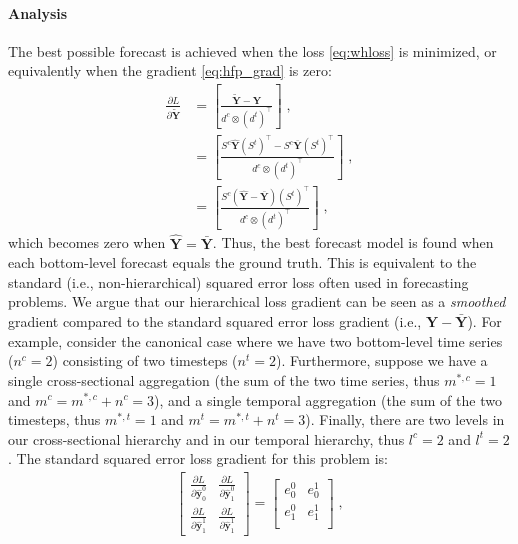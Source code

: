 \documentclass[preprint, 3p, times, twocolumn]{elsarticle}
\begin{document}
\paragraph{Analysis} The best possible forecast is achieved when the loss \eqref{eq:whloss} is minimized, or equivalently when the gradient \eqref{eq:hfp_grad} is zero:
\begin{align} 
  \frac{\partial L}{\partial \tilde{\textbf{Y}}} &=  \left[ \frac{\tilde{\textbf{Y}} - \textbf{Y}}{ d^c \otimes (d^t)^\intercal } \right] \;, \nonumber \\
                                                 &=  \left[ \frac{S^c \hat{\textbf{Y}} (S^t)^\intercal - S^c \bar{\textbf{Y}} (S^t)^\intercal}{ d^c \otimes (d^t)^\intercal } \right] \;, \nonumber \\
                                                 &=  \left[ \frac{S^c \left(\hat{\textbf{Y}} - \bar{\textbf{Y}}\right) (S^t)^\intercal}{ d^c \otimes (d^t)^\intercal } \right] \;, \nonumber
\end{align}
which becomes zero when \(\hat{\textbf{Y}} = \bar{\textbf{Y}}\). Thus, the best forecast model is found when each bottom-level forecast equals the ground truth. This is equivalent to the standard (i.e., non-hierarchical) squared error loss often used in forecasting problems. We argue that our hierarchical loss gradient can be seen as a \textit{smoothed} gradient compared to the standard squared error loss gradient (i.e., \(\hat{\textbf{Y}} - \bar{\textbf{Y}}\)). For example, consider the canonical case where we have two bottom-level time series (\(n^c=2\)) consisting of two timesteps (\(n^t=2\)). Furthermore, suppose we have a single cross-sectional aggregation (the sum of the two time series, thus \(m^{*,c} = 1\) and \(m^c = m^{*,c} + n^c = 3\)), and a single temporal aggregation (the sum of the two timesteps, thus \(m^{*,t} = 1\) and \(m^t = m^{*,t} + n^t = 3\)). Finally, there are two levels in our cross-sectional hierarchy and in our temporal hierarchy, thus \(l^c = 2\) and \(l^t = 2\). The standard squared error loss gradient for this problem is:
\begin{align} \label{eq:sqloss_grad}
  \begin{bmatrix}
    \frac{\partial L}{\partial \hat{\textbf{y}}^0_{0}} & \frac{\partial L}{\partial \hat{\textbf{y}}^0_{1}} \\
    \frac{\partial L}{\partial \hat{\textbf{y}}^1_{1}} & \frac{\partial L}{\partial \hat{\textbf{y}}^1_{1}}
    \end{bmatrix} 
    = 
\begin{bmatrix}
  e_0^0 & e_0^1 \\
  e_1^0 & e_1^1 \\
\end{bmatrix}  \;, 
\end{align}
\end{document}
